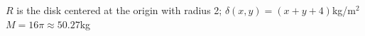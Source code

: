 {$R$ is the disk centered at the origin with radius 2; $\delta(x,y) = (x+y+4)$kg/m$^2$
}
{$M = 16\pi\approx 50.27$kg%
}